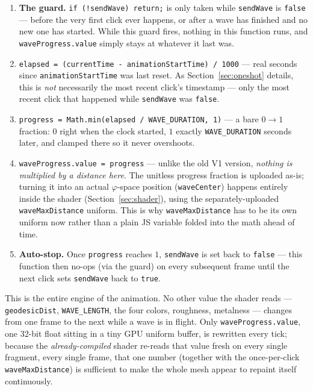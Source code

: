 \documentclass[11pt]{article}
\newcommand{\code}[1]{\texttt{#1}}
\begin{document}
\begin{enumerate}[leftmargin=1.6em]
\item \textbf{The guard.} \code{if (!sendWave) return;} is only taken while
  \code{sendWave} is \code{false} --- before the very first click ever happens, or after a
  wave has finished and no new one has started. While this guard fires, nothing in this
  function runs, and \code{waveProgress.value} simply stays at whatever it last was.
\item \code{elapsed = (currentTime - animationStartTime) / 1000} --- real seconds since
  \code{animationStartTime} was last reset. As Section~\ref{sec:oneshot} details, this is
  \emph{not} necessarily the most recent click's timestamp --- only the most recent click
  that happened while \code{sendWave} was \code{false}.
\item \code{progress = Math.min(elapsed / WAVE\_DURATION, 1)} --- a bare $0\to1$ fraction:
  $0$ right when the clock started, $1$ exactly \code{WAVE\_DURATION} seconds later, and
  clamped there so it never overshoots.
\item \code{waveProgress.value = progress} --- unlike the old V1 version, \emph{nothing is
  multiplied by a distance here}. The unitless progress fraction is uploaded as-is; turning
  it into an actual $\varphi$-space position (\code{waveCenter}) happens entirely inside the
  shader (Section~\ref{sec:shader}), using the separately-uploaded \code{waveMaxDistance}
  uniform. This is why \code{waveMaxDistance} has to be its own uniform now rather than a
  plain JS variable folded into the math ahead of time.
\item \textbf{Auto-stop.} Once \code{progress} reaches $1$, \code{sendWave} is set back to
  \code{false} --- this function then no-ops (via the guard) on every subsequent frame until
  the next click sets \code{sendWave} back to \code{true}.
\end{enumerate}

This is the entire engine of the animation. No other value the shader reads ---
\code{geodesicDist}, \code{WAVE\_LENGTH}, the four colors, roughness, metalness --- changes
from one frame to the next while a wave is in flight. Only \code{waveProgress.value}, one
32-bit float sitting in a tiny GPU uniform buffer, is rewritten every tick; because the
\emph{already-compiled} shader re-reads that value fresh on every single fragment, every
single frame, that one number (together with the once-per-click \code{waveMaxDistance}) is
sufficient to make the whole mesh appear to repaint itself continuously.
\end{document}

